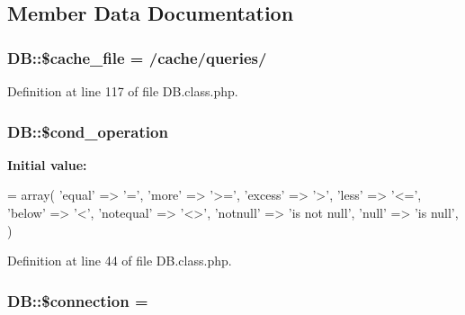 \subsection{Member Data Documentation}
\subsubsection[{\texorpdfstring{\$cache\+\_\+file}{$cache_file}}]{\setlength{\rightskip}{0pt plus 5cm}D\+B\+::\$cache\+\_\+file = /cache/queries/\textquotesingle{}}\hypertarget{classDB_a9952a27cbf07942e5bb8853ab95b5bdb}{}\label{classDB_a9952a27cbf07942e5bb8853ab95b5bdb}


Definition at line 117 of file D\+B.\+class.\+php.

\subsubsection[{\texorpdfstring{\$cond\+\_\+operation}{$cond_operation}}]{\setlength{\rightskip}{0pt plus 5cm}D\+B\+::\$cond\+\_\+operation}\hypertarget{classDB_a85f8f65c37474b0e65d844e1f01f39b0}{}\label{classDB_a85f8f65c37474b0e65d844e1f01f39b0}
{\bfseries Initial value\+:}
\begin{DoxyCode}
= array(
        \textcolor{stringliteral}{'equal'} => \textcolor{charliteral}{'='},
        \textcolor{stringliteral}{'more'} => \textcolor{stringliteral}{'>='},
        \textcolor{stringliteral}{'excess'} => \textcolor{charliteral}{'>'},
        \textcolor{stringliteral}{'less'} => \textcolor{stringliteral}{'<='},
        \textcolor{stringliteral}{'below'} => \textcolor{charliteral}{'<'},
        \textcolor{stringliteral}{'notequal'} => \textcolor{stringliteral}{'<>'},
        \textcolor{stringliteral}{'notnull'} => \textcolor{stringliteral}{'is not null'},
        \textcolor{stringliteral}{'null'} => \textcolor{stringliteral}{'is null'},
    )
\end{DoxyCode}


Definition at line 44 of file D\+B.\+class.\+php.

\subsubsection[{\texorpdfstring{\$connection}{$connection}}]{\setlength{\rightskip}{0pt plus 5cm}D\+B\+::\$connection = \textquotesingle{}\textquotesingle{}}\hypertarget{classDB_ac9071e31f8241ad644430537f39a16ce}{}\label{classDB_ac9071e31f8241ad644430537f39a16ce}


